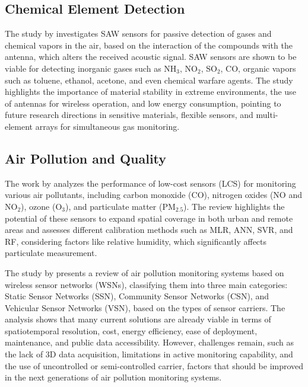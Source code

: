 \documentclass[conference]{IEEEtran}
\begin{document}

\subsection{Chemical Element Detection}

The study by \cite{devkota_2017_saw} investigates SAW sensors for passive detection of gases and chemical vapors in the air, based on the interaction of the compounds with the antenna, which alters the received acoustic signal. SAW sensors are shown to be viable for detecting inorganic gases such as NH$_3$, NO$_2$, SO$_2$, CO, organic vapors such as toluene, ethanol, acetone, and even chemical warfare agents.
The study highlights the importance of material stability in extreme environments, the use of antennas for wireless operation, and low energy consumption, pointing to future research directions in sensitive materials, flexible sensors, and multi-element arrays for simultaneous gas monitoring.

\subsection{Air Pollution and Quality}

The work by \cite{karagulian_2019_review} analyzes the performance of low-cost sensors (LCS) for monitoring various air pollutants, including carbon monoxide (CO), nitrogen oxides (NO and NO$_2$), ozone (O$_3$), and particulate matter (PM$_{2.5}$). The review highlights the potential of these sensors to expand spatial coverage in both urban and remote areas and assesses different calibration methods such as MLR, ANN, SVR, and RF, considering factors like relative humidity, which significantly affects particulate measurement.

The study by \cite{yi_2015_a} presents a review of air pollution monitoring systems based on wireless sensor networks (WSNs), classifying them into three main categories: Static Sensor Networks (SSN), Community Sensor Networks (CSN), and Vehicular Sensor Networks (VSN), based on the types of sensor carriers. The analysis shows that many current solutions are already viable in terms of spatiotemporal resolution, cost, energy efficiency, ease of deployment, maintenance, and public data accessibility. However, challenges remain, such as the lack of 3D data acquisition, limitations in active monitoring capability, and the use of uncontrolled or semi-controlled carrier, factors that should be improved in the next generations of air pollution monitoring systems.
\end{document}
